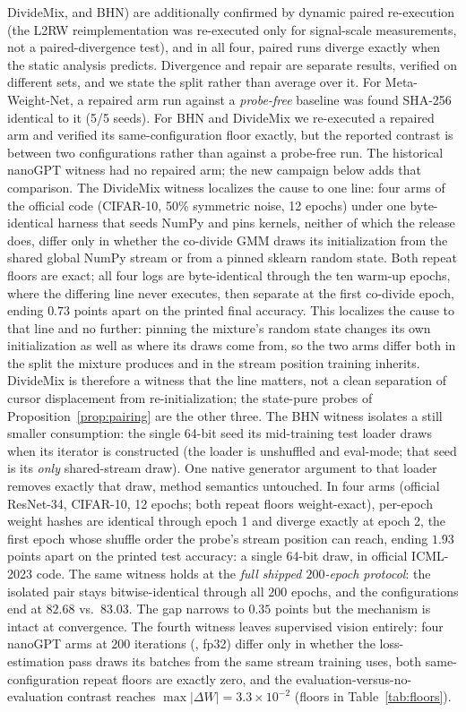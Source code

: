 DivideMix, and BHN) are
additionally confirmed by dynamic paired re-execution (the L2RW
reimplementation was re-executed only for signal-scale measurements, not a
paired-divergence test), and in all four, paired runs diverge exactly when the
static analysis predicts. Divergence and repair are separate results, verified
on different sets, and we state the split rather than average over it.
For Meta-Weight-Net, a repaired arm run against a \emph{probe-free}
baseline was found SHA-256 identical to it (5/5 seeds). For
BHN and DivideMix we re-executed a repaired arm and verified its
same-configuration floor exactly, but the reported contrast is between two
configurations rather than against a probe-free run. The historical nanoGPT
witness had no repaired arm; the new campaign below adds that comparison.
The DivideMix witness localizes the cause to one
line: four arms of the official code (CIFAR-10, 50\% symmetric noise, 12
epochs) under one byte-identical harness that seeds NumPy and pins kernels,
neither of which the release does, differ only in whether the co-divide GMM
draws its initialization from the shared global NumPy stream or from a pinned
sklearn random state. Both repeat floors are exact; all four logs are
byte-identical through the ten warm-up epochs, where the differing line
never executes, then separate at the first co-divide epoch, ending
$0.73$ points apart on the printed final accuracy. This localizes the cause to
that line and no further: pinning the mixture's random state changes its own
initialization as well as where its draws come from, so the two arms differ
both in the split the mixture produces and in the stream position training
inherits. DivideMix is therefore a witness that the line matters, not a clean
separation of cursor displacement from re-initialization; the state-pure probes
of Proposition~\ref{prop:pairing} are the other three. The BHN witness isolates a
still smaller consumption: the single 64-bit
seed its mid-training test loader draws when its iterator is constructed
(the loader is unshuffled and eval-mode; that seed is its \emph{only}
shared-stream draw). One native generator argument to that loader removes
exactly that draw, method semantics untouched. In four arms (official
ResNet-34, CIFAR-10, 12 epochs; both repeat floors weight-exact),
per-epoch weight hashes are identical through epoch 1 and diverge exactly
at epoch 2, the first epoch whose shuffle order the probe's stream
position can reach, ending $1.93$ points apart on the printed test
accuracy: a single 64-bit draw, in official ICML-2023 code. The same
witness holds at the \emph{full shipped $200$-epoch protocol}: the
isolated pair stays bitwise-identical through all $200$ epochs, and the
configurations end at $82.68$ vs.\ $83.03$. The gap narrows to $0.35$
points but the mechanism is intact at convergence. The fourth witness
leaves supervised vision entirely: four nanoGPT arms at $200$ iterations
(, fp32) differ only in whether the loss-estimation
pass draws its batches from the same  stream training uses,
both same-configuration repeat floors are exactly zero, and the
evaluation-versus-no-evaluation contrast reaches
$\max|\Delta W| = 3.3\times10^{-2}$ (floors in Table~\ref{tab:floors}).

